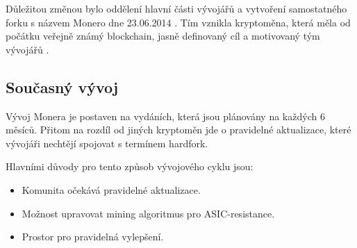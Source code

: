 \documentclass[
  printed, %
  table,   %
  nolof,     %
  nolot,     %
           oneside, color
]{fithesis3}
\begin{document}
Důležitou změnou bylo oddělení hlavní části vývojářů a vytvoření samostatného forku s názvem Monero dne 23.06.2014 . Tím vznikla kryptoměna, která měla od počátku veřejně známý blockchain, jasně definovaný cíl a motivovaný tým vývojářů \cite{monerofork}.




\subsection{Současný vývoj}
Vývoj Monera je postaven na vydáních, která jsou plánovány na každých 6 měsíců. Přitom na rozdíl od jiných kryptoměn jde o pravidelné aktualizace, které vývojáři nechtějí spojovat s termínem hardfork.


Hlavními důvody pro tento způsob vývojového cyklu jsou:
\begin{itemize}\itemsep0em
\item Komunita očekává pravidelné aktualizace.
\item Možnost upravovat mining algoritmus pro ASIC-resistance.
\item Prostor pro pravidelná vylepšení.
\end{itemize}
\end{document}
